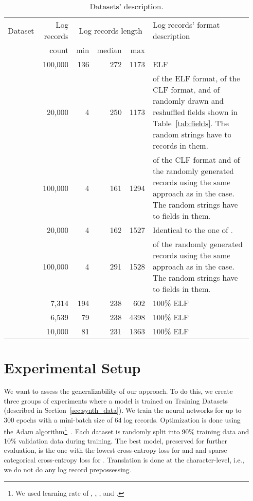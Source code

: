 \documentclass{article}
\begin{document}
\begin{table*}[bt]
\caption{ Datasets' description.}
\label{tab:datasets}
\centering
\begin{tabular}{@{}lrrrrp{}@{}}
\toprule
Dataset & Log records&  \multicolumn{3}{c}{Log records length}   & Log records' format description \\
  \cmidrule{3-5}
 & count & min & median & max  &   \\
\midrule
  & 100,000 & 136 & 272 & 1173              &  ELF  \\
  & 20,000 & 4 & 250 & 1173              &  of the ELF format,  of the CLF format, and  of randomly drawn and reshuffled fields shown in Table~\ref{tab:fields}.  The random strings have  to  records in them.  \\
  & 100,000 & 4 & 161 & 1294              &  of the CLF format and   of the randomly generated records using the same approach as in the  case. The random strings have  to  fields in them.    \\
  & 20,000 & 4 & 162 & 1527              &  Identical to the one of .  \\
  & 100,000 & 4 & 291 & 1528              &  of the randomly generated records using the same approach as in the  case. The random strings have  to  fields in them.    \\
\midrule
  & 7,314 & 194 & 238 & 602 & 100\% ELF                                \\
  & 6,539 & 79 & 238 & 4398 & 100\% ELF                                \\
  & 10,000 & 81 & 231 & 1363  & 100\% ELF                                \\ 
\bottomrule
\end{tabular}
\end{table*}

\section{Experimental Setup} \label{sec:setup}
We want to assess the generalizability of our approach. To do this, we create three groups of experiments where a model is trained on Training Datasets  (described in Section~\ref{sec:synth_data}). We train the neural networks for up to 300 epochs with a mini-batch size of 64 log records. Optimization is done using the Adam algorithm\footnote{We used learning rate of , , , and .}~\cite{DBLP:journals/corr/KingmaB14}. Each dataset is randomly split into 90\% training data and 10\% validation data during training.  The best model, preserved for further evaluation, is the one with the lowest cross-entropy loss for  and  and sparse categorical cross-entropy loss for . Translation is done at the character-level, i.e., we do not do any log record prepossessing.
\end{document}
